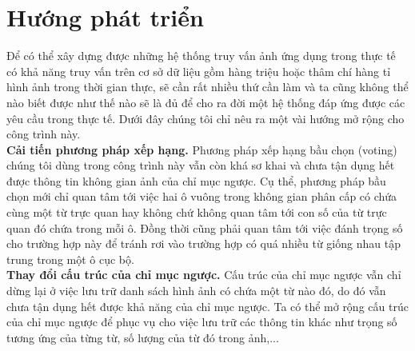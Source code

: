 \section{Hướng phát triển}
Để có thể xây dựng được những hệ thống truy vấn ảnh ứng dụng trong thực tế có khả năng truy vấn trên cơ sở dữ liệu gồm hàng triệu hoặc thâm chí hàng tỉ hình ảnh trong thời gian thực, sẽ cần rất nhiều thứ cần làm và ta cũng không thể nào biết được như thế nào sẽ là đủ để cho ra đời một hệ thống đáp ứng được các yêu cầu trong thực tế. Dưới đây chúng tôi chỉ nêu ra một vài hướng mở rộng cho công trình này.\\
\textbf{Cải tiến phương pháp xếp hạng.} Phương pháp xếp hạng bầu chọn (voting) chúng tôi dùng trong công trình này vẫn còn khá sơ khai và chưa tận dụng hết được thông tin không gian ảnh của chỉ mục ngược. Cụ thể, phương pháp bầu chọn mới chỉ quan tâm tới việc hai ô vuông trong không gian phân cấp có chứa cùng một từ trực quan hay không chứ không quan tâm tới con số của từ trực quan đó chứa trong mỗi ô. Đồng thời cũng phải quan tâm tới việc đánh trọng số cho trường hợp này để tránh rơi vào trường hợp có quá nhiều từ giống nhau tập trung trong một ô cục bộ.\\
\textbf{Thay đổi cấu trúc của chỉ mục ngược.} Cấu trúc của chỉ mục ngược vẫn chỉ dừng lại ở việc lưu trữ danh sách hình ảnh có chứa một từ nào đó, do đó vẫn chưa tận dụng hết được khả năng của chỉ mục ngược. Ta có thể mở rộng cấu trúc của chỉ mục ngược để phục vụ cho việc lưu trữ các thông tin khác như trọng số tương ứng của từng từ, số lượng của từ đó trong ảnh,...







